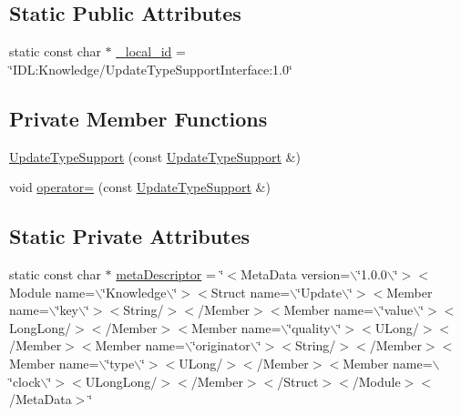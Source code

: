 \subsection*{Static Public Attributes}
\begin{DoxyCompactItemize}
\item 
static const char $\ast$ \hyperlink{classKnowledge_1_1UpdateTypeSupportInterface_a4ae733778e6ac777af3c82fe4ff2927d}{\_\-local\_\-id} = \char`\"{}IDL:Knowledge/UpdateTypeSupportInterface:1.0\char`\"{}
\end{DoxyCompactItemize}
\subsection*{Private Member Functions}
\begin{DoxyCompactItemize}
\item 
\hyperlink{classKnowledge_1_1UpdateTypeSupport_ae1d96fbd538b4ca9a2a6f0ee4d621292}{UpdateTypeSupport} (const \hyperlink{classKnowledge_1_1UpdateTypeSupport}{UpdateTypeSupport} \&)
\item 
void \hyperlink{classKnowledge_1_1UpdateTypeSupport_ab8db5b870ed6360edc8040f7f0f39682}{operator=} (const \hyperlink{classKnowledge_1_1UpdateTypeSupport}{UpdateTypeSupport} \&)
\end{DoxyCompactItemize}
\subsection*{Static Private Attributes}
\begin{DoxyCompactItemize}
\item 
static const char $\ast$ \hyperlink{classKnowledge_1_1UpdateTypeSupport_a647d28a536f6433afefc901995d57e40}{metaDescriptor} = \char`\"{}$<$MetaData version=$\backslash$\char`\"{}1.0.0$\backslash$\char`\"{}$>$$<$Module name=$\backslash$\char`\"{}Knowledge$\backslash$\char`\"{}$>$$<$Struct name=$\backslash$\char`\"{}Update$\backslash$\char`\"{}$>$$<$Member name=$\backslash$\char`\"{}key$\backslash$\char`\"{}$>$$<$String/$>$$<$/Member$>$$<$Member name=$\backslash$\char`\"{}value$\backslash$\char`\"{}$>$$<$LongLong/$>$$<$/Member$>$$<$Member name=$\backslash$\char`\"{}quality$\backslash$\char`\"{}$>$$<$ULong/$>$$<$/Member$>$$<$Member name=$\backslash$\char`\"{}originator$\backslash$\char`\"{}$>$$<$String/$>$$<$/Member$>$$<$Member name=$\backslash$\char`\"{}type$\backslash$\char`\"{}$>$$<$ULong/$>$$<$/Member$>$$<$Member name=$\backslash$\char`\"{}clock$\backslash$\char`\"{}$>$$<$ULongLong/$>$$<$/Member$>$$<$/Struct$>$$<$/Module$>$$<$/MetaData$>$\char`\"{}
\end{DoxyCompactItemize}


